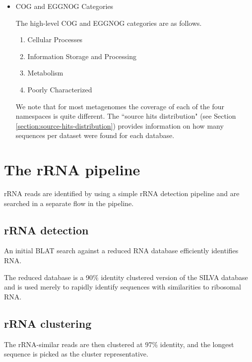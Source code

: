 \documentclass[12pt,fullpage]{report}
\begin{document}
\begin{itemize}
\item COG and EGGNOG Categories

The high-level COG and EGGNOG categories are as follows.
\begin{enumerate}
\item Cellular Processes
\item Information Storage and Processing
\item Metabolism
\item Poorly Characterized
\end{enumerate}

We note that for most metagenomes the coverage of each of the four namespaces is quite different. The ``source hits distribution" (see Section \ref{section:source-hits-distribution}) provides information on how many sequences per dataset
were found for each database.
\end{itemize}

\section{The rRNA pipeline}

\gls{rRNA} reads are identified by using a simple rRNA detection pipeline and are searched in a separate flow in the pipeline.
\subsection{rRNA detection}
 An initial BLAT \cite{BLAT} search against a reduced RNA database efficiently identifies RNA.

The reduced database is a 90\% identity clustered version of the SILVA database and is used merely to rapidly identify sequences with similarities to ribosomal RNA.


\subsection{rRNA clustering}
The rRNA-similar reads are then clustered at 97\% identity, and the longest sequence is picked as the cluster representative.
\end{document}
